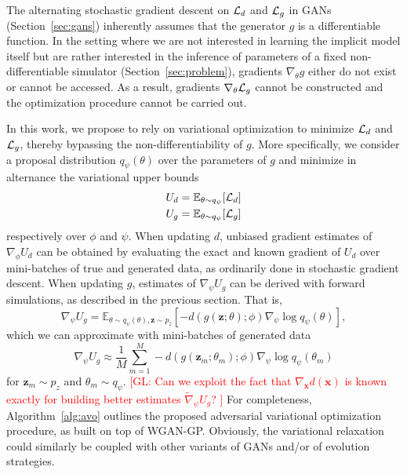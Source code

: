 \documentclass[twocolumn,superscriptaddress,aps]{revtex4-1}
\newcommand{\glnote}[1]{\textcolor{red}{[GL: #1]}}
\theoremstyle{plain}
\begin{document}
The alternating stochastic gradient descent on ${\cal L}_d$ and ${\cal L}_g$ in
GANs (Section~\ref{sec:gans}) inherently assumes that the generator $g$ is a differentiable function. In
the setting where we are not interested in learning the implicit model itself but are
rather interested in the inference of parameters of a fixed
non-differentiable simulator (Section~\ref{sec:problem}),
gradients $\nabla_\theta g$ either do not exist or cannot be accessed. As a
result, gradients $\nabla_\theta {\cal L}_g$ cannot be constructed and the
optimization procedure cannot be carried out.

In this work, we propose to rely on variational optimization to minimize ${\cal
L}_d$ and ${\cal L}_g$, thereby bypassing the non-differentiability of $g$. More
specifically, we consider a proposal distribution $q_\psi(\theta)$ over the
parameters of $g$ and minimize in alternance the variational upper bounds
\begin{align}
    U_d &= \mathbb{E}_{\theta \sim q_\psi} [ {\cal L}_d ] \label{eqn:vo-ud} \\
    U_g &= \mathbb{E}_{\theta \sim q_\psi} [ {\cal L}_g ] \label{eqn:vo-ug}
\end{align} respectively over $\phi$ and $\psi$.
When updating
$d$, unbiased gradient estimates of $\nabla_\phi U_d$ can be obtained by
evaluating the exact and known gradient of $U_d$ over mini-batches of true and
generated data, as ordinarily done in stochastic gradient descent. When updating
$g$, estimates of $\nabla_\psi U_g$ can be derived with forward
simulations, as described in the previous section.
That is,
\begin{equation}
    \nabla_\psi U_g = \mathbb{E}_{\theta \sim q_\psi(\theta), \mathbf{z} \sim p_z}  [-d(g(\mathbf{z};\theta);\phi) \nabla_\psi \log q_\psi(\theta)],
\end{equation} which we can approximate with mini-batches of
generated data
\begin{equation}
    \nabla_\psi U_g \approx \frac{1}{M} \sum_{m=1}^M -d(g(\mathbf{z}_m; \theta_m); \phi) \nabla_\psi \log q_\psi(\theta_m)
\end{equation}
for $\mathbf{z}_m \sim p_z$ and $\theta_m \sim q_\psi$.
\glnote{Can we exploit the fact that $\nabla_\mathbf{x} d(\mathbf{x})$
is known exactly for building better estimates $\tilde{\nabla}_\psi U_g$?
}
For completeness, Algorithm~\ref{alg:avo} outlines the proposed adversarial variational
optimization procedure, as built on top of WGAN-GP.
Obviously, the variational relaxation could similarly be coupled with
other variants of GANs and/or of evolution strategies.
\end{document}
